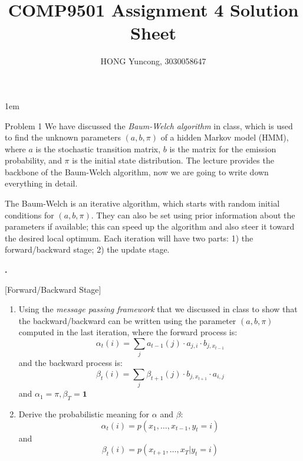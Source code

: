 \documentclass{article}
\newcounter{pcounter}                                   %
\newenvironment{problem}                                %
{                                                       %
    \color{gray}                                        %
    \stepcounter{pcounter}                              %
    \textbf{\arabic{pcounter}.}                         %
}{}                                                     %
\newcommand{\vecOne}{\textbf{1}}                        %
\begin{document}
    \parindent 0in
    \parskip 1em
    \title{COMP9501 Assignment 4 Solution Sheet}
    \author{HONG Yuncong, 3030058647}
    \maketitle

    \begin{section}{Problem 1}
        \setcounter{pcounter}{0}
        We have discussed the \emph{Baum-Welch algorithm} in class, which is used to find the unknown parameters $(a,b,\pi)$ of a hidden Markov model (HMM),
        where $a$ is the stochastic transition matrix, $b$ is the matrix for the emission probability, and $\pi$ is the initial state distribution. The lecture provides the backbone of the Baum-Welch algorithm, now we are going to write down everything in detail.

        The Baum-Welch is an iterative algorithm, which starts with random initial conditions for $(a,b,\pi)$. They can also be set using prior information about the parameters if available; this can speed up the algorithm and also steer it toward the desired local optimum. Each iteration will have two parts: 1) the forward/backward stage; 2) the update stage.

        \begin{problem}
            [Forward/Backward Stage]

            \begin{enumerate}[label=\alph*)]
                \item Using the \textit{message passing framework} that we discussed in class to show that the backward/backward can be written using the parameter $(a,b,\pi)$ computed in the last iteration, where the forward process is:
                $$
                \alpha_t(i) = \sum_j a_{t-1}(j) \cdot a_{j,i} \cdot b_{j,x_{t-1}}
                $$
                and the backward process is:
                $$
                \beta_t(i) = \sum_j \beta_{t+1}(j) \cdot b_{j,x_{t+1}} \cdot a_{i,j}
                $$
                and $\alpha_1 = \pi, \beta_T = \vecOne$

                \item Derive the probabilistic meaning for $\alpha$ and $\beta$:
                $$
                \alpha_t(i) = p(x_1, \dots, x_{t-1}, y_t=i)
                $$
                and
                $$
                \beta_t(i) = p(x_{t+1}, \dots, x_T | y_t=i)
                $$
            \end{enumerate}
        \end{problem}


\end{section}
\end{document}
